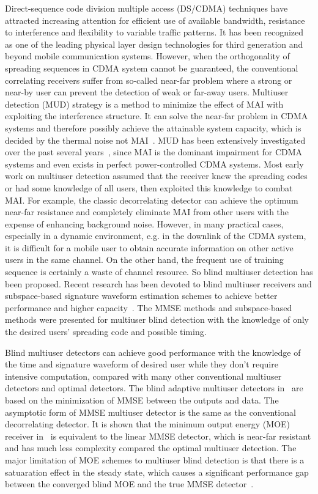 \documentclass[a4paper,11pt,fleqn]{article}
\begin{document}
Direct-sequence code division multiple access (DS/CDMA) techniques
have attracted increasing attention for efficient use of available
bandwidth, resistance to interference and flexibility to variable
traffic patterns. It has been recognized as one of the leading
physical layer design technologies for third generation and beyond
mobile communication systems. However, when the orthogonality of
spreading sequences in CDMA system cannot be guaranteed, the
conventional correlating receivers suffer from so-called near-far
problem where a strong or near-by user can prevent the detection
of weak or far-away users. Multiuser detection (MUD) strategy is a
method to minimize the effect of MAI with exploiting the
interference structure. It can solve the near-far problem in CDMA
systems and therefore possibly achieve the attainable system
capacity, which is decided by the thermal noise not
MAI~\cite{Verd86}. MUD has been extensively investigated over the
past several years~\cite{Verd98}, since MAI is the dominant
impairment for CDMA systems and even exists in perfect
power-controlled CDMA systems. Most early work on multiuser
detection assumed that the receiver knew the spreading codes or
had some knowledge of all users, then exploited this knowledge to
combat MAI. For example, the classic decorrelating detector can
achieve the optimum near-far resistance and completely eliminate
MAI from other users with the expense of enhancing background
noise. However, in many practical cases, especially in a dynamic
environment, e.g. in the downlink of the CDMA system, it is
difficult for a mobile user to obtain accurate information on
other active users in the same channel. On the other hand, the
frequent use of training sequence is certainly a waste of channel
resource. So blind multiuser detection has been proposed. Recent
research has been devoted to blind multiuser receivers and
subspace-based signature waveform estimation schemes to achieve
better performance and higher capacity~\cite{Madh94,Honi95,
Poor97, Wang98, Torl97, Liu96}. The MMSE methods and
subspace-based methods were presented for multiuser blind
detection with the knowledge of only the desired users' spreading
code and possible timing.

Blind multiuser detectors can achieve good performance with the
knowledge of the time and signature waveform of desired user while
they don't require intensive computation, compared with many other
conventional multiuser detectors and optimal detectors. The blind
adaptive multiuser detectors in~\cite{Madh94,Honi95} are based on
the minimization of MMSE between the outputs and data. The
asymptotic form of MMSE multiuser detector is the same as the
conventional decorrelating detector. It is shown that the minimum
output energy (MOE) receiver in~\cite{Honi95} is equivalent to the
linear MMSE detector, which is near-far resistant and has much
less complexity compared the optimal multiuser detection. The
major limitation of MOE schemes to multiuser blind detection is
that there is a satuaration effect in the steady state, which
causes a significant performance gap between the converged blind
MOE and the true MMSE detector~\cite{Honi95}.
\end{document}
